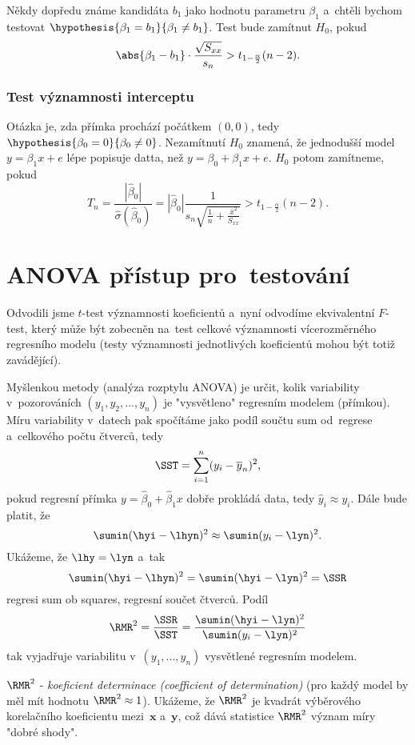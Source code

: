 \begin{remark}
	Někdy dopředu známe kandidáta $b_1$ jako hodnotu parametru $\beta_1$ a~chtěli bychom testovat 
	$\hypothesis{\beta_1=b_1}{\beta_1\neq b_1}$. Test bude zamítnut $H_0$, pokud 
	$$ \abs{\beta_1-b_1}\cdot \frac{\sqrt{S_{xx}}}{s_n}> t_{1-\frac{\alpha}{2}}(n-2). $$
\end{remark}
\subsubsection*{Test významnosti interceptu}
Otázka je, zda přímka prochází počátkem $(0,0)$, tedy $\hypothesis{\beta_0=0}{\beta_0\neq0}$. Nezamítnutí $H_0$ znamená, že jednodušší model $y=\beta_1 x+e$ lépe popisuje datta, než $y=\beta_0+\beta_1 x+e$. $H_0$ potom zamítneme, pokud
$$ T_n=\frac{|\widehat{\beta}_0|}{\widehat{\sigma}(\widehat{\beta}_0)}=|\widehat{\beta}_0|\frac{1}{s_n\sqrt{\frac{1}{n}+\frac{\overline{x}^2}{S_{xx}}}}>t_{1-\frac{\alpha}{2}}(n-2). $$

\section{ANOVA přístup pro~testování}
Odvodili jsme $t$-test významnosti koeficientů a~nyní odvodíme ekvivalentní $F$-test, který může být zobecněn na~test celkové významnosti vícerozměrného regresního modelu (testy významnosti jednotlivých koeficientů mohou být totiž zavádějící). 

Myšlenkou metody (analýza rozptylu ANOVA) je určit, kolik variability v~pozorováních $(y_1,y_2,...,y_n)$ je "vysvětleno" regresním modelem (přímkou). Míru variability v~datech pak spočítáme jako podíl součtu sum od~regrese a~celkového počtu čtverců, tedy
$$ \SST=\sum_{i=1}^{n}(y_i-\overline{y}_n)^2, $$
pokud regresní přímka $y=\widehat{\beta}_0+\widehat{\beta}_1 x$ dobře prokládá data, tedy $\widehat{y}_i\approx y_i$. Dále bude platit, že 
$$ \sumin (\hyi-\lhyn)^2\approx\sumin (y_i-\lyn)^2. $$
Ukážeme, že $\lhy=\lyn$ a~tak 
$$ \sumin(\hyi-\lhyn)^2=\sumin (\hyi-\lyn)^2=\SSR $$ regresi sum ob squares, regresní součet čtverců. Podíl
$$ \RMR^2=\frac{\SSR}{\SST}=\frac{\sumin (\hyi-\lyn)^2}{\sumin (y_i-\lyn)^2}$$ tak vyjadřuje variabilitu v~$(y_1,...,y_n)$ vysvětlené regresním modelem. 

$\RMR^2$ - \textit{koeficient determinace (coefficient of determination)} (pro každý model by měl mít hodnotu $\RMR^2\approx 1$). Ukážeme, že $\RMR^2$ je kvadrát výběrového korelačního koeficientu mezi~$\textbf{x}$ a~$\textbf{y}$, což dává statistice $\RMR^2$ význam míry "dobré shody". 

